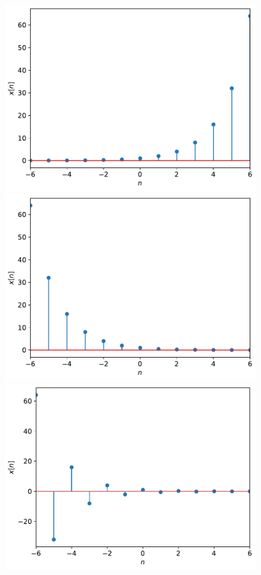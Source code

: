 \begin{figure}[ht]    
\includegraphics[scale=0.5]{graphics/dtexpcase1.pdf}
\includegraphics[scale=0.5]{graphics/dtexpcase2.pdf}
\includegraphics[scale=0.5]{graphics/dtexpcase3.pdf}

\end{figure}
